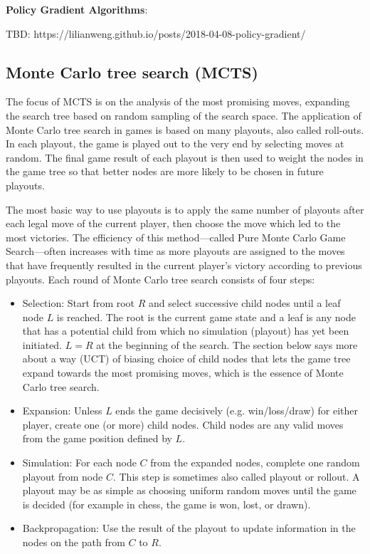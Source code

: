 \documentclass{article}
\begin{document}
\noindent \textbf{Policy Gradient Algorithms}:

\noindent TBD: https://lilianweng.github.io/posts/2018-04-08-policy-gradient/

\subsection{Monte Carlo tree search (MCTS)}

\noindent The focus of MCTS is on the analysis of the most promising moves, expanding the search tree based on random sampling of the search space. The application of Monte Carlo tree search in games is based on many playouts, also called roll-outs. In each playout, the game is played out to the very end by selecting moves at random. The final game result of each playout is then used to weight the nodes in the game tree so that better nodes are more likely to be chosen in future playouts.

\bigskip

\noindent The most basic way to use playouts is to apply the same number of playouts after each legal move of the current player, then choose the move which led to the most victories. The efficiency of this method—called Pure Monte Carlo Game Search—often increases with time as more playouts are assigned to the moves that have frequently resulted in the current player's victory according to previous playouts. Each round of Monte Carlo tree search consists of four steps:

\begin{itemize}
    \item Selection: Start from root \(R\) and select successive child nodes until a leaf node \(L\) is reached. The root is the current game state and a leaf is any node that has a potential child from which no simulation (playout) has yet been initiated. \(L = R\) at the beginning of the search. The section below says more about a way (UCT) of biasing choice of child nodes that lets the game tree expand towards the most promising moves, which is the essence of Monte Carlo tree search.
    \item Expansion: Unless \(L\) ends the game decisively (e.g. win/loss/draw) for either player, create one (or more) child nodes. Child nodes are any valid moves from the game position defined by \(L\).
    \item Simulation: For each node \(C\) from the expanded nodes, complete one random playout from node \(C\). This step is sometimes also called playout or rollout. A playout may be as simple as choosing uniform random moves until the game is decided (for example in chess, the game is won, lost, or drawn).
    \item Backpropagation: Use the result of the playout to update information in the nodes on the path from \(C\) to \(R\).
\end{itemize}
\end{document}
